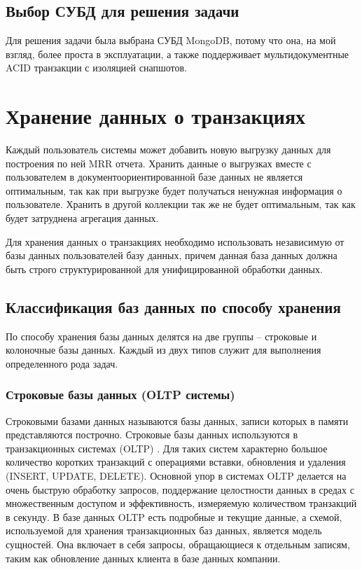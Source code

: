 \subsection{Выбор СУБД для решения задачи}

Для решения задачи была выбрана СУБД MongoDB, потому что она, на мой взгляд, более проста в эксплуатации, а также поддерживает мультидокументные ACID \cite{ACID} транзакции с изоляцией снапшотов.

\section{Хранение данных о транзакциях}

Каждый пользователь системы может добавить новую выгрузку данных для построения по ней MRR отчета. Хранить данные о выгрузках вместе с пользователем в документоориентированной базе данных не является оптимальным, так как при выгрузке будет получаться ненужная информация о пользователе. Хранить в другой коллекции так же не будет оптимальным, так как будет затруднена агрегация данных.

Для хранения данных о транзакциях необходимо использовать независимую от базы данных пользователей базу данных, причем данная база данных должна быть строго структурированной для унифицированной обработки данных.

\subsection{Классификация баз данных по способу хранения}

По способу хранения базы данных делятся на две группы -- строковые и колоночные базы данных. Каждый из двух типов служит для выполнения определенного рода задач.

\subsubsection{Строковые базы данных (OLTP системы)}

Строковыми базами данных называются базы данных, записи которых в памяти представляются построчно. Строковые базы данных используются в транзакционных системах (OLTP) \cite{oltp}. Для таких систем характерно большое количество коротких транзакций с операциями вставки, обновления и удаления (INSERT, UPDATE, DELETE). Основной упор в системах OLTP делается на очень быструю обработку запросов, поддержание целостности данных в средах с множественным доступом и эффективность, измеряемую количеством транзакций в секунду. В базе данных OLTP есть подробные и текущие данные, а схемой, используемой для хранения транзакционных баз данных, является модель сущностей. Она включает в себя запросы, обращающиеся к отдельным записям, таким как обновление данных клиента в базе данных компании.

